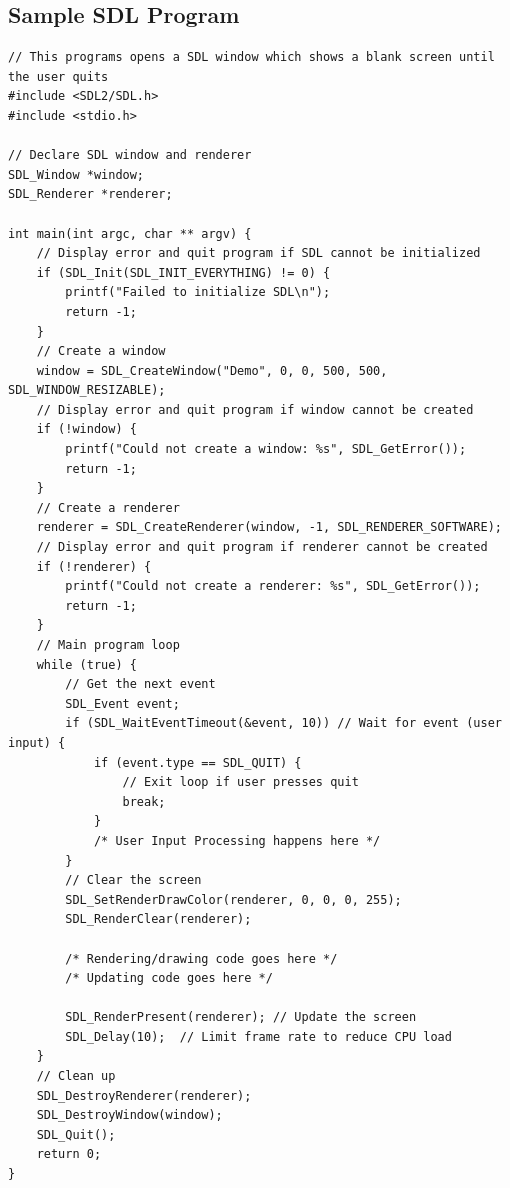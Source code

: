 \documentclass[report]{subfiles}
\begin{document}
    \subsection{Sample SDL Program}
    \begin{mdframed}[backgroundcolor=bg]
    \begin{verbatim}
// This programs opens a SDL window which shows a blank screen until the user quits
#include <SDL2/SDL.h>
#include <stdio.h>

// Declare SDL window and renderer
SDL_Window *window;
SDL_Renderer *renderer;

int main(int argc, char ** argv) {
    // Display error and quit program if SDL cannot be initialized
    if (SDL_Init(SDL_INIT_EVERYTHING) != 0) {
        printf("Failed to initialize SDL\n");
        return -1;
    }
    // Create a window
    window = SDL_CreateWindow("Demo", 0, 0, 500, 500, SDL_WINDOW_RESIZABLE);
    // Display error and quit program if window cannot be created
    if (!window) {
        printf("Could not create a window: %s", SDL_GetError());
        return -1;
    }
    // Create a renderer
    renderer = SDL_CreateRenderer(window, -1, SDL_RENDERER_SOFTWARE);
    // Display error and quit program if renderer cannot be created
    if (!renderer) {
        printf("Could not create a renderer: %s", SDL_GetError());
        return -1;
    }
    // Main program loop
    while (true) {
        // Get the next event
        SDL_Event event;
        if (SDL_WaitEventTimeout(&event, 10)) // Wait for event (user input) {
            if (event.type == SDL_QUIT) {
                // Exit loop if user presses quit
                break;
            }
	        /* User Input Processing happens here */
        }
        // Clear the screen
        SDL_SetRenderDrawColor(renderer, 0, 0, 0, 255);
        SDL_RenderClear(renderer);

        /* Rendering/drawing code goes here */
        /* Updating code goes here */

        SDL_RenderPresent(renderer); // Update the screen
        SDL_Delay(10);	// Limit frame rate to reduce CPU load
    }
    // Clean up
    SDL_DestroyRenderer(renderer);
    SDL_DestroyWindow(window);
    SDL_Quit();
    return 0;
}
\end{verbatim}
    \end{mdframed}
\end{document}
